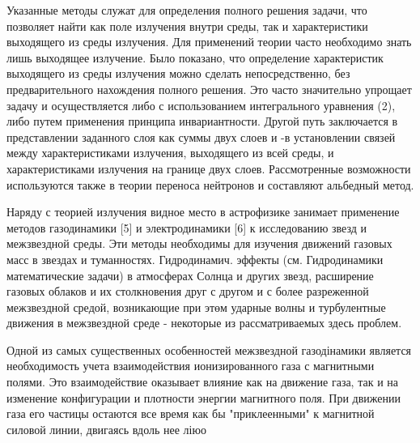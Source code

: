 \documentclass[10pt]{article}
\begin{document}
Указанные методы служат для определения полного решения задачи, что позволяет найти как поле излучения внутри среды, так и характеристики выходящего из среды излучения. Для применений теории часто необходимо знать лишь выходящее излучение. Было показано, что определение характеристик выходящего из среды излучения можно сделать непосредственно, без предварительного нахождения полного решения. Это часто значительно упрощает задачу и осуществляется либо с использованием интегрального уравнения (2), либо путем применения принципа инвариантности. Другой путь заключается в представлении заданного слоя как суммы двух слоев и -в установлении связей между характеристиками излучения, выходящего из всей среды, и характеристиками излучения на границе двух слоев. Рассмотренные возможности используются также в теории переноса нейтронов и составляют альбедный метод.



Наряду с теорией излучения видное место в астрофизике занимает применение методов газодинамики [5] и электродинамики [6] к исследованию звезд и межзвездной среды. Эти методы необходимы для изучения движений газовых масс в звездах и туманностях. Гидродинамич. эффекты (см. Гидродинамики математические задачи) в атмосферах Солнца и других звезд, расширение газовых облаков и их столкновения друг с другом и с более разреженной межзвездной средой, возникающие при этөм ударные волны и турбулентные движения в межзвездной среде - некоторые из рассматриваемых здесь проблем.



Одной из самых существенных особенностей межзвездной газодінамики является необходимость учета взаимодействия ионизированного газа с магнитными полями. Это взаимодействие оказывает влияние как на движение газа, так и на изменение конфигурации и плотности энергии магнитного поля. При движении газа его частицы остаются все время как бы "приклеенными" к магнитной силовой линии, двигаясь вдоль нее ліюо
\end{document}
